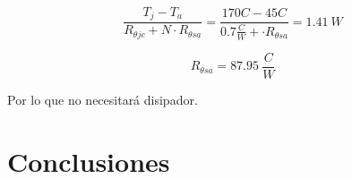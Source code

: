 	\begin{equation}
	\frac{T_j - T_a}{R_{\theta jc} + N \cdot R_{\theta sa}} = \frac{170  C - 45  C}{ 0.7 \frac{ C}{W} + \cdot R_{\theta sa}} = 1.41 \ W
	\end{equation}
	
		\begin{equation}
	R_{\theta sa} = 87.95 \ \frac{ C}{W}
	\end{equation}

Por lo que no necesitará disipador.	
	
\section{Conclusiones}
	\label{simulaciones}
	
	
